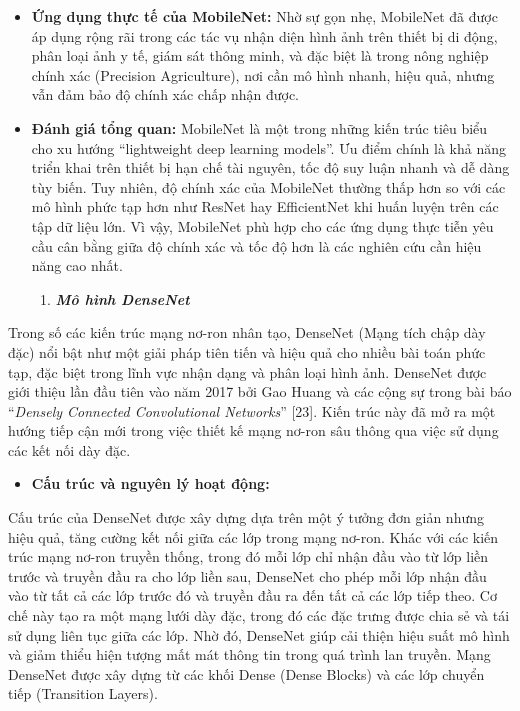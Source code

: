 \documentclass[
]{article}
\begin{document}
\begin{itemize}
\item
  \textbf{Ứng dụng thực tế của MobileNet:} Nhờ sự gọn nhẹ, MobileNet đã
  được áp dụng rộng rãi trong các tác vụ nhận diện hình ảnh trên thiết
  bị di động, phân loại ảnh y tế, giám sát thông minh, và đặc biệt là
  trong nông nghiệp chính xác (Precision Agriculture), nơi cần mô hình
  nhanh, hiệu quả, nhưng vẫn đảm bảo độ chính xác chấp nhận được.
\item
  \textbf{Đánh giá tổng quan:} MobileNet là một trong những kiến trúc
  tiêu biểu cho xu hướng ``lightweight deep learning models''. Ưu điểm
  chính là khả năng triển khai trên thiết bị hạn chế tài nguyên, tốc độ
  suy luận nhanh và dễ dàng tùy biến. Tuy nhiên, độ chính xác của
  MobileNet thường thấp hơn so với các mô hình phức tạp hơn như ResNet
  hay EfficientNet khi huấn luyện trên các tập dữ liệu lớn. Vì vậy,
  MobileNet phù hợp cho các ứng dụng thực tiễn yêu cầu cân bằng giữa độ
  chính xác và tốc độ hơn là các nghiên cứu cần hiệu năng cao nhất.

  \begin{enumerate}
  \def\labelenumi{\arabic{enumi}.}
  \item
    \protect{}\label{_Toc232112022}{}\emph{\textbf{Mô hình
    DenseNet}}
  \end{enumerate}
\end{itemize}

Trong số các kiến trúc mạng nơ-ron nhân tạo, DenseNet (Mạng tích chập
dày đặc) nổi bật như một giải pháp tiên tiến và hiệu quả cho nhiều bài
toán phức tạp, đặc biệt trong lĩnh vực nhận dạng và phân loại hình ảnh.
DenseNet được giới thiệu lần đầu tiên vào năm 2017 bởi Gao Huang và các
cộng sự trong bài báo ``\emph{Densely Connected Convolutional
Networks}'' {[}23{]}. Kiến trúc này đã mở ra một hướng tiếp cận mới
trong việc thiết kế mạng nơ-ron sâu thông qua việc sử dụng các kết nối
dày đặc.

\begin{itemize}
\item
  \textbf{Cấu trúc và nguyên lý hoạt động:}
\end{itemize}

Cấu trúc của DenseNet được xây dựng dựa trên một ý tưởng đơn giản nhưng
hiệu quả, tăng cường kết nối giữa các lớp trong mạng nơ-ron. Khác với
các kiến trúc mạng nơ-ron truyền thống, trong đó mỗi lớp chỉ nhận đầu
vào từ lớp liền trước và truyền đầu ra cho lớp liền sau, DenseNet cho
phép mỗi lớp nhận đầu vào từ tất cả các lớp trước đó và truyền đầu ra
đến tất cả các lớp tiếp theo. Cơ chế này tạo ra một mạng lưới dày đặc,
trong đó các đặc trưng được chia sẻ và tái sử dụng liên tục giữa các
lớp. Nhờ đó, DenseNet giúp cải thiện hiệu suất mô hình và giảm thiểu
hiện tượng mất mát thông tin trong quá trình lan truyền. Mạng DenseNet
được xây dựng từ các khối Dense (Dense Blocks) và các lớp chuyển tiếp
(Transition Layers).
\end{document}
